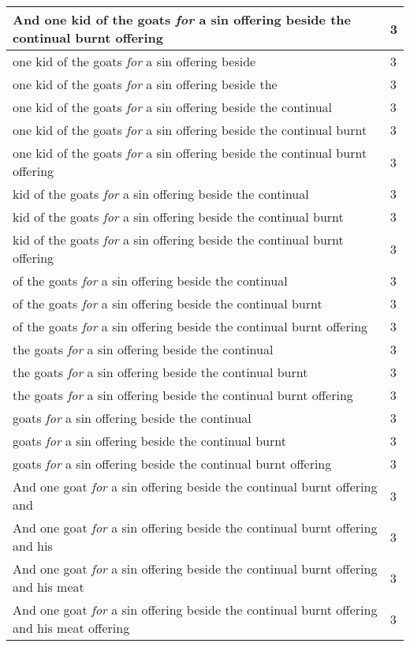 \begin{center}
\begin{longtable}{|p{3.0in}|p{0.5in}|}
And one kid of the goats \emph{for} a sin offering beside the continual burnt offering & 3\\ \hline 
one kid of the goats \emph{for} a sin offering beside & 3\\ \hline 
one kid of the goats \emph{for} a sin offering beside the & 3\\ \hline 
one kid of the goats \emph{for} a sin offering beside the continual & 3\\ \hline 
one kid of the goats \emph{for} a sin offering beside the continual burnt & 3\\ \hline 
one kid of the goats \emph{for} a sin offering beside the continual burnt offering & 3\\ \hline 
kid of the goats \emph{for} a sin offering beside the continual & 3\\ \hline 
kid of the goats \emph{for} a sin offering beside the continual burnt & 3\\ \hline 
kid of the goats \emph{for} a sin offering beside the continual burnt offering & 3\\ \hline 
of the goats \emph{for} a sin offering beside the continual & 3\\ \hline 
of the goats \emph{for} a sin offering beside the continual burnt & 3\\ \hline 
of the goats \emph{for} a sin offering beside the continual burnt offering & 3\\ \hline 
the goats \emph{for} a sin offering beside the continual & 3\\ \hline 
the goats \emph{for} a sin offering beside the continual burnt & 3\\ \hline 
the goats \emph{for} a sin offering beside the continual burnt offering & 3\\ \hline 
goats \emph{for} a sin offering beside the continual & 3\\ \hline 
goats \emph{for} a sin offering beside the continual burnt & 3\\ \hline 
goats \emph{for} a sin offering beside the continual burnt offering & 3\\ \hline 
And one goat \emph{for} a sin offering beside the continual burnt offering and & 3\\ \hline 
And one goat \emph{for} a sin offering beside the continual burnt offering and his & 3\\ \hline 
And one goat \emph{for} a sin offering beside the continual burnt offering and his meat & 3\\ \hline 
And one goat \emph{for} a sin offering beside the continual burnt offering and his meat offering & 3\\ \hline 

\end{longtable}
\end{center}
